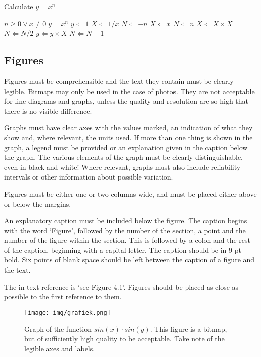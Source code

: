 \begin{algorithm}[!tbp] 
\caption{Calculate $y = x^n$}
\label{alg:some_algorithm}
\begin{algorithmic}
\REQUIRE $n \geq 0 \vee x \neq 0$
\ENSURE $y = x^n$
\STATE $y \Leftarrow 1$
\STATE $X \Leftarrow 1 / x$
\STATE $N \Leftarrow -n$
\ELSE
\STATE $X \Leftarrow x$
\STATE $N \Leftarrow n$
\ENDIF
{}
\STATE $X \Leftarrow X \times X$
\STATE $N \Leftarrow N / 2$
\ELSE[$N$ is odd]
\STATE $y \Leftarrow y \times X$
\STATE $N \Leftarrow N - 1$
\ENDIF
\ENDWHILE
\end{algorithmic}
\end{algorithm}

\subsection{Figures}\label{sec:_figures}
Figures must be comprehensible and the text they contain must be clearly legible. Bitmaps may only be used in the case of photos. They are not acceptable for line diagrams and graphs, unless the quality and resolution are so high that there is no visible difference.

Graphs must have clear axes with the values marked, an indication of what they show and, where relevant, the units used. If more than one thing is shown in the graph, a legend must be provided or an explanation given in the caption below the graph. The various elements of the graph must be clearly distinguishable, even in black and white! Where relevant, graphs must also include reliability intervals or other information about possible variation.

Figures must be either one or two columns wide, and must be placed either above or below the margins.

An explanatory caption must be included below the figure. The caption begins with the word ‘Figure’, followed by the number of the section, a point and the number of the figure within the section. This is followed by a colon and the rest of the caption, beginning with a capital letter. The caption should be in 9-pt bold. Six points of blank space should be left between the caption of a figure and the text.

The in-text reference is ‘see Figure 4.1’. Figures should be placed as close as possible to the first reference to them.

\begin{figure}[!tbp]
    \centering
        \texttt{[image: img/grafiek.png]}
    \caption{Graph of the function $sin(x) \cdot sin(y)$. This figure is a bitmap, but of sufficiently high quality to be acceptable. Take note of the legible axes and labels.}
    \label{fig:afb1}
\end{figure}

